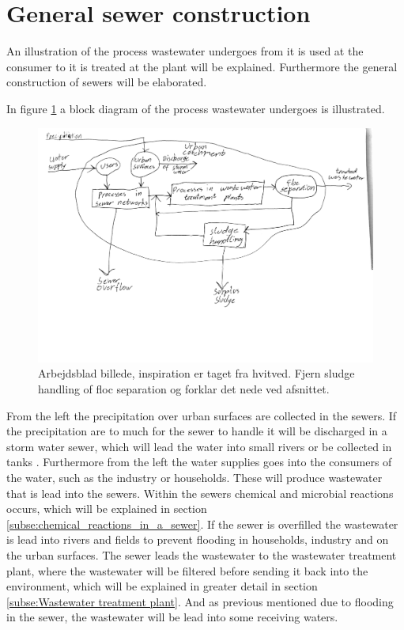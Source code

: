 \section{General sewer construction}\label{se:sewer_construction}
An illustration of the process wastewater undergoes from it is used at the consumer to it is treated at the plant will be explained. Furthermore the general construction of sewers will be elaborated.    

In figure \ref{fig:sewer_overview_of_the_different_parts} a block diagram of the process wastewater undergoes is illustrated.
\begin{figure}[H]
\centering
\includegraphics[width=1\textwidth]{report/introduction/pictures/sewer_process2.pdf}
\caption{Arbejdsblad billede, inspiration er taget fra hvitved. Fjern sludge handling of floc separation og forklar det nede ved afsnittet.}
\label{fig:sewer_overview_of_the_different_parts}
\end{figure}
From the left the precipitation over urban surfaces are collected in the sewers. If the precipitation are to much for the sewer to handle it will be discharged in a storm water sewer, which will lead the water into small rivers or be collected in tanks . Furthermore from the left the water supplies goes into the consumers of the water, such as the industry or households. These will produce wastewater that is lead into the sewers. Within the sewers chemical and microbial reactions occurs, which will be explained in section \ref{subse:chemical_reactions_in_a_sewer}. If the sewer is overfilled the wastewater is lead into rivers and fields to prevent flooding in households, industry and on the urban surfaces. The sewer leads the wastewater to the wastewater treatment plant, where the wastewater will be filtered before sending it back into the environment, which will be explained in greater detail in section \ref{subse:Wastewater treatment plant}. And as previous mentioned due to flooding in the sewer, the wastewater will be lead into some receiving waters. 

